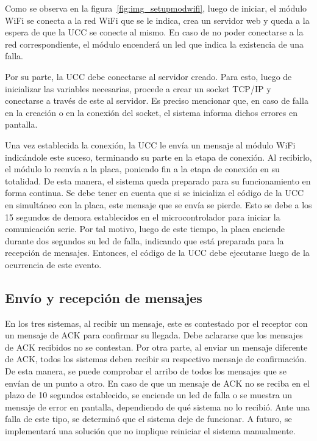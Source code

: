 Como se observa en la figura~\ref{fig:img_setupmodwifi}, luego de iniciar, el módulo WiFi se conecta a la red WiFi que se le indica, crea un servidor web y queda a la espera de que la UCC se conecte al mismo. En caso de no poder conectarse a la red correspondiente, el módulo encenderá un led que indica la existencia de una falla.

Por su parte, la UCC debe conectarse al servidor creado. Para esto, luego de inicializar las variables necesarias, procede a crear un socket TCP/IP y conectarse a través de este al servidor. Es preciso mencionar que, en caso de falla en la creación o en la conexión del socket, el sistema informa dichos errores en pantalla.

Una vez establecida la conexión, la UCC le envía un mensaje al módulo WiFi indicándole este suceso, terminando su parte en la etapa de conexión. Al recibirlo, el módulo lo reenvía a la placa, poniendo fin a la etapa de conexión en su totalidad. De esta manera, el sistema queda preparado para su funcionamiento en forma continua. Se debe tener en cuenta que si se inicializa el código de la UCC en simultáneo con la placa, este mensaje que se envía se pierde. Esto se debe a los 15 segundos de demora establecidos en el microcontrolador para iniciar la comunicación serie. Por tal motivo, luego de este tiempo, la placa enciende durante dos segundos su led de falla, indicando que está preparada para la recepción de mensajes. Entonces, el código de la UCC debe ejecutarse luego de la ocurrencia de este evento.


\subsection{Envío y recepción de mensajes}

En los tres sistemas, al recibir un mensaje, este es contestado por el receptor con un mensaje de ACK para confirmar su llegada. Debe aclararse que los mensajes de ACK recibidos no se contestan. Por otra parte, al enviar un mensaje diferente de ACK, todos los sistemas deben recibir su respectivo mensaje de confirmación. De esta manera, se puede comprobar el arribo de todos los mensajes que se envían de un punto a otro. En caso de que un mensaje de ACK no se reciba en el plazo de 10 segundos establecido, se enciende un led de falla o se muestra un mensaje de error en pantalla, dependiendo de qué sistema no lo recibió. Ante una falla de este tipo, se determinó que el sistema deje de funcionar. A futuro, se implementará una solución que no implique reiniciar el sistema manualmente.

